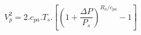 \[
V_p^2 = 2.c_{pa}.T_s.
        \left[ \left(1+\frac{\Delta P}{P_s}\right)^{R_a/c_{pa} } -1 \right]
\]
